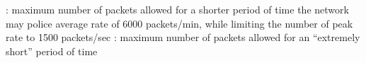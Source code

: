 \documentclass{myart}
\begin{document}
	\eit
\w {}: maximum number of packets allowed for a shorter
	period of time
	\bit
	\w the network may police average rate of 6000 packets/min, while
limiting the number of peak rate to 1500 packets/sec
	\eit
\w {}: maximum number of packets allowed for an ``extremely
	short'' period of time
\w 
\eit








\end{document}
